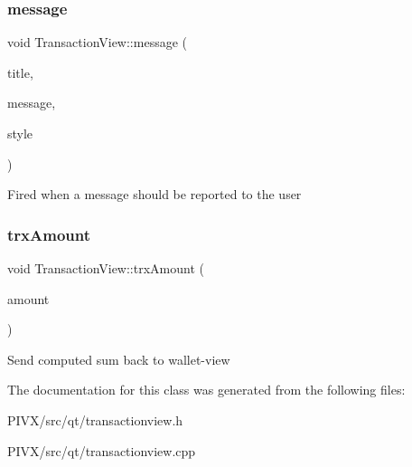 \subsubsection{\texorpdfstring{message}{message}}
{\footnotesize\ttfamily void Transaction\+View\+::message (\begin{DoxyParamCaption}\item[{const Q\+String \&}]{title,  }\item[{const Q\+String \&}]{message,  }\item[{unsigned int}]{style }\end{DoxyParamCaption})\hspace{0.3cm}{\ttfamily [signal]}}

Fired when a message should be reported to the user \mbox{\label{class_transaction_view_a139ef5288ce13ce14c17907b4d80c0e8}} 
\subsubsection{\texorpdfstring{trx\+Amount}{trxAmount}}
{\footnotesize\ttfamily void Transaction\+View\+::trx\+Amount (\begin{DoxyParamCaption}\item[{Q\+String}]{amount }\end{DoxyParamCaption})\hspace{0.3cm}{\ttfamily [signal]}}

Send computed sum back to wallet-\/view 

The documentation for this class was generated from the following files\+:\begin{DoxyCompactItemize}
\item 
P\+I\+V\+X/src/qt/transactionview.\+h\item 
P\+I\+V\+X/src/qt/transactionview.\+cpp\end{DoxyCompactItemize}
